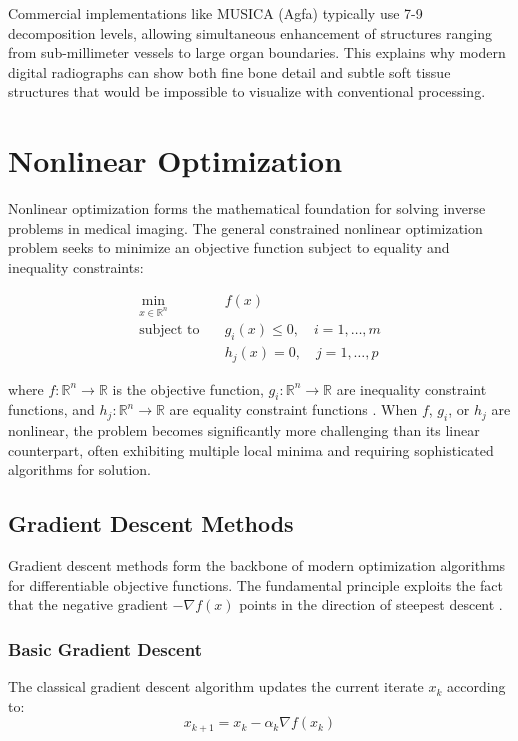 \documentclass[nomenclature, english, bibtex]{kththesis}
\numberwithin{listing}{chapter}
\begin{document}
Commercial implementations like MUSICA (Agfa) typically use 7-9 decomposition levels, allowing simultaneous enhancement of structures ranging from sub-millimeter vessels to large organ boundaries. This explains why modern digital radiographs can show both fine bone detail and subtle soft tissue structures that would be impossible to visualize with conventional processing.

\section{Nonlinear Optimization}

Nonlinear optimization forms the mathematical foundation for solving inverse problems in medical imaging. The general constrained nonlinear optimization problem seeks to minimize an objective function subject to equality and inequality constraints:

\begin{equation}
\begin{aligned}
\min_{x \in \mathbb{R}^n} \quad & f(x) \\
\text{subject to} \quad & g_i(x) \leq 0, \quad i = 1, \ldots, m \\
& h_j(x) = 0, \quad j = 1, \ldots, p
\end{aligned}
\end{equation}

where $f: \mathbb{R}^n \to \mathbb{R}$ is the objective function, $g_i: \mathbb{R}^n \to \mathbb{R}$ are inequality constraint functions, and $h_j: \mathbb{R}^n \to \mathbb{R}$ are equality constraint functions \cite{nocedal2006numerical}. When $f$, $g_i$, or $h_j$ are nonlinear, the problem becomes significantly more challenging than its linear counterpart, often exhibiting multiple local minima and requiring sophisticated algorithms for solution.

\subsection{Gradient Descent Methods}

Gradient descent methods form the backbone of modern optimization algorithms for differentiable objective functions. The fundamental principle exploits the fact that the negative gradient $-\nabla f(x)$ points in the direction of steepest descent \cite{boyd2004convex}.

\subsubsection{Basic Gradient Descent}
The classical gradient descent algorithm updates the current iterate $x_k$ according to:
\begin{equation}
x_{k+1} = x_k - \alpha_k \nabla f(x_k)
\end{equation}
\end{document}

